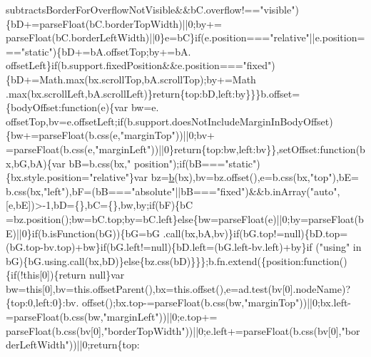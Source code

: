 \begin{DoxyCode}
      subtractsBorderForOverflowNotVisible&&bC.overflow!==\textcolor{stringliteral}{"visible"})\{bD+=parseFloat(bC.borderTopWidth)||0;by+=
      parseFloat(bC.borderLeftWidth)||0\}e=bC\}\textcolor{keywordflow}{if}(e.position===\textcolor{stringliteral}{"relative"}||e.position===\textcolor{stringliteral}{"static"})\{bD+=bA.offsetTop;by+=bA.
      offsetLeft\}\textcolor{keywordflow}{if}(b.support.fixedPosition&&e.position===\textcolor{stringliteral}{"fixed"})\{bD+=Math.max(bx.scrollTop,bA.scrollTop);by+=Math
      .max(bx.scrollLeft,bA.scrollLeft)\}\textcolor{keywordflow}{return}\{top:bD,left:by\}\}\}b.offset=\{bodyOffset:\textcolor{keyword}{function}(e)\{var bw=e.
      offsetTop,bv=e.offsetLeft;\textcolor{keywordflow}{if}(b.support.doesNotIncludeMarginInBodyOffset)\{bw+=parseFloat(b.css(e,\textcolor{stringliteral}{"marginTop"}))||0;bv+
      =parseFloat(b.css(e,\textcolor{stringliteral}{"marginLeft"}))||0\}\textcolor{keywordflow}{return}\{top:bw,left:bv\}\},setOffset:\textcolor{keyword}{function}(bx,bG,bA)\{var bB=b.css(bx,\textcolor{stringliteral}{"
      position"});\textcolor{keywordflow}{if}(bB===\textcolor{stringliteral}{"static"})\{bx.style.position=\textcolor{stringliteral}{"relative"}\}var bz=\hyperlink{jquery_8js_aa4026ad5544b958e54ce5e106fa1c805}{b}(bx),bv=bz.offset(),e=b.css(bx,\textcolor{stringliteral}{"top"}),bE=
      b.css(bx,\textcolor{stringliteral}{"left"}),bF=(bB===\textcolor{stringliteral}{"absolute"}||bB===\textcolor{stringliteral}{"fixed"})&&b.inArray(\textcolor{stringliteral}{"auto"},[e,bE])>-1,bD=\{\},bC=\{\},bw,by;\textcolor{keywordflow}{if}(bF)\{bC
      =bz.position();bw=bC.top;by=bC.left\}\textcolor{keywordflow}{else}\{bw=parseFloat(e)||0;by=parseFloat(bE)||0\}\textcolor{keywordflow}{if}(b.isFunction(bG))\{bG=bG
      .call(bx,bA,bv)\}\textcolor{keywordflow}{if}(bG.top!=null)\{bD.top=(bG.top-bv.top)+bw\}\textcolor{keywordflow}{if}(bG.left!=null)\{bD.left=(bG.left-bv.left)+by\}\textcolor{keywordflow}{if}
      (\textcolor{stringliteral}{"using"} in bG)\{bG.using.call(bx,bD)\}\textcolor{keywordflow}{else}\{bz.css(bD)\}\}\};b.fn.extend(\{position:\textcolor{keyword}{function}()\{\textcolor{keywordflow}{if}(!\textcolor{keyword}{this}[0])\{\textcolor{keywordflow}{return}
       null\}var bw=\textcolor{keyword}{this}[0],bv=this.offsetParent(),bx=this.offset(),e=ad.test(bv[0].nodeName)?\{top:0,left:0\}:bv.
      offset();bx.top-=parseFloat(b.css(bw,\textcolor{stringliteral}{"marginTop"}))||0;bx.left-=parseFloat(b.css(bw,\textcolor{stringliteral}{"marginLeft"}))||0;e.top+=
      parseFloat(b.css(bv[0],\textcolor{stringliteral}{"borderTopWidth"}))||0;e.left+=parseFloat(b.css(bv[0],\textcolor{stringliteral}{"borderLeftWidth"}))||0;\textcolor{keywordflow}{return}\{top:

\end{DoxyCode}
